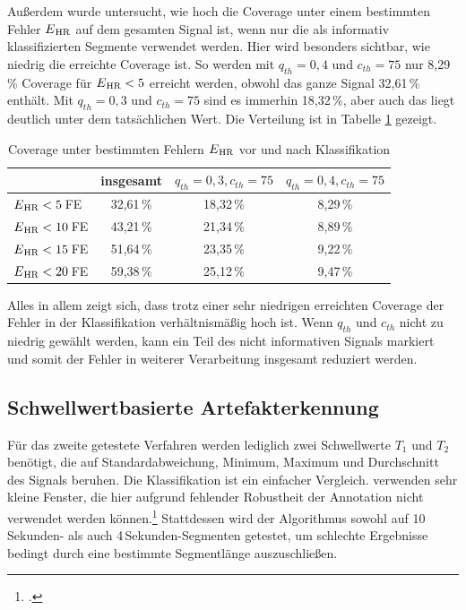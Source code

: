  Außerdem wurde untersucht, wie hoch die Coverage unter einem bestimmten Fehler $E\textsubscript{HR}$ auf dem gesamten Signal ist, wenn nur die als informativ klassifizierten Segmente verwendet werden. Hier wird besonders sichtbar, wie niedrig die erreichte Coverage ist. So werden mit $q_{th}=0{,}4$ und $c_{th}=75$ nur 8{,}29\,\% Coverage für $E\textsubscript{HR} < 5$ erreicht werden, obwohl das ganze Signal 32{,}61\,\% enthält. Mit $q_{th}=0{,}3$ und $c_{th}=75$ sind es immerhin 18{,}32\,\%, aber auch das liegt deutlich unter dem tatsächlichen Wert. Die Verteilung ist in Tabelle \ref{fig:brueser-coverage} gezeigt.
 
 \begin{table}[h]
 	\centering
  	\begin{tabular}{l || c | c | c}
 											& insgesamt 		& $q_{th}=0{,}3, c_{th}=75$ & $q_{th}=0{,}4, c_{th}=75$\\\hline
 		$E\textsubscript{HR} < 5$\,\si{FE} 	&  32{,}61\,\% 	& 18,32\,\% 					& 8,29\,\%	\\
 		$E\textsubscript{HR} < 10$\,\si{FE} 	&  43{,}21\,\% 	& 21,34\,\% 					& 8,89\,\%	\\
 		$E\textsubscript{HR} < 15$\,\si{FE} 	&  51{,}64\,\% 	& 23,35\,\% 					& 9,22\,\%	\\
 		$E\textsubscript{HR} < 20$\,\si{FE} 	&  59{,}38\,\% 	& 25,12\,\% 					& 9,47\,\%\\
 	\end{tabular}
 	\caption[Coverage unter bestimmten Fehlern $E\textsubscript{HR}$ vor und nach Klassifikation durch Betrachtung der Ähnlichkeit der \ac{CLIE}-Intervallschätzer]{Coverage unter bestimmten Fehlern $E\textsubscript{HR}$ vor und nach Klassifikation}
 	\label{fig:brueser-coverage}
 \end{table}
 
 Alles in allem zeigt sich, dass trotz einer sehr niedrigen erreichten Coverage der Fehler in der Klassifikation verhältnismäßig hoch ist. Wenn $q_{th}$ und $c_{th}$ nicht zu niedrig gewählt werden, kann ein Teil des nicht informativen Signals markiert und somit der Fehler in weiterer Verarbeitung insgesamt reduziert werden. 
 

\subsection{Schwellwertbasierte Artefakterkennung}

Für das zweite getestete Verfahren werden lediglich zwei Schwellwerte $T_1$ und $T_2$ benötigt, die auf Standardabweichung, Minimum, Maximum und Durchschnitt des Signals beruhen. Die Klassifikation ist ein einfacher Vergleich. \citeauthor{Pino2015} verwenden sehr kleine Fenster, die hier aufgrund fehlender Robustheit der Annotation nicht verwendet werden können.\footcite[]{Pino2015} Stattdessen wird der Algorithmus sowohl auf 10\,Sekunden- als auch 4\,Sekunden-Segmenten getestet, um schlechte Ergebnisse bedingt durch eine bestimmte Segmentlänge auszuschließen.%

